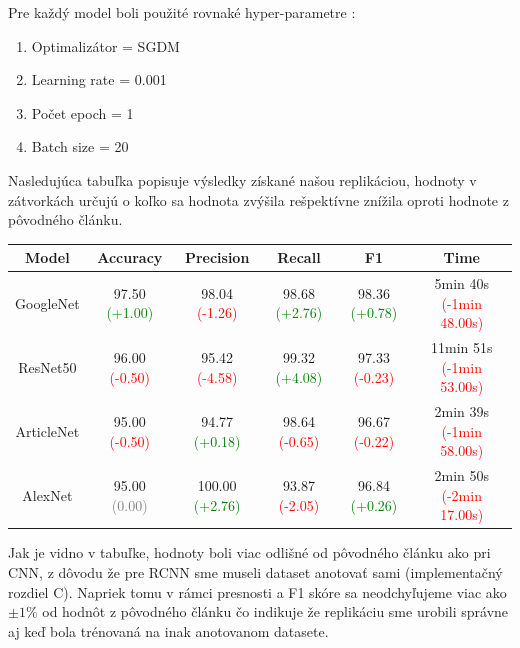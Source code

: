 \documentclass[journal,onecolumn]{IEEEtran}
\begin{document}
Pre každý model boli použité rovnaké hyper-parametre :
\begin{enumerate}
  \item Optimalizátor = SGDM
  \item Learning rate = 0.001
  \item Počet epoch = 1
  \item Batch size = 20
\end{enumerate}

\vspace{10pt}
Nasledujúca tabuľka popisuje výsledky získané našou replikáciou, hodnoty v zátvorkách určujú o koľko sa hodnota zvýšila rešpektívne znížila oproti hodnote z pôvodného článku.

\begin{center}
{\renewcommand{\arraystretch}{1.5}
\begin{tabular}{|c|ccccc}
\hline
Model & Accuracy & Precision & Recall & F1 & Time \\                            
\hline          

GoogleNet & 
97.50 \textcolor{green}{(+1.00)} & 
98.04 \textcolor{red}{(-1.26)} & 
98.68 \textcolor{green}{(+2.76)} & 
98.36 \textcolor{green}{(+0.78)} & 
5min 40s \textcolor{red}{(-1min 48.00s)} \\

ResNet50 & 
96.00 \textcolor{red}{(-0.50)} & 
95.42 \textcolor{red}{(-4.58)} & 
99.32 \textcolor{green}{(+4.08)} & 
97.33 \textcolor{red}{(-0.23)} & 
11min 51s \textcolor{red}{(-1min 53.00s)} \\

ArticleNet & 
95.00 \textcolor{red}{(-0.50)} & 
94.77 \textcolor{green}{(+0.18)} & 
98.64 \textcolor{red}{(-0.65)} & 
96.67 \textcolor{red}{(-0.22)} & 
2min 39s \textcolor{red}{(-1min 58.00s)} \\

AlexNet & 
95.00 \textcolor{gray}{(0.00)} & 
100.00 \textcolor{green}{(+2.76)} & 
93.87 \textcolor{red}{(-2.05)} & 
96.84 \textcolor{green}{(+0.26)} & 
2min 50s \textcolor{red}{(-2min 17.00s)} 

\end{tabular}}
\end{center}

\vspace{10pt}
Jak je vidno v tabuľke, hodnoty boli viac odlišné od pôvodného článku ako pri CNN, z dôvodu že pre RCNN sme museli dataset anotovať sami (implementačný rozdiel C). Napriek tomu v rámci presnosti a F1 skóre sa neodchyľujeme viac ako $\pm 1\%$ od hodnôt z pôvodného článku čo indikuje že replikáciu sme urobili správne aj keď bola trénovaná na inak anotovanom datasete.
\end{document}

